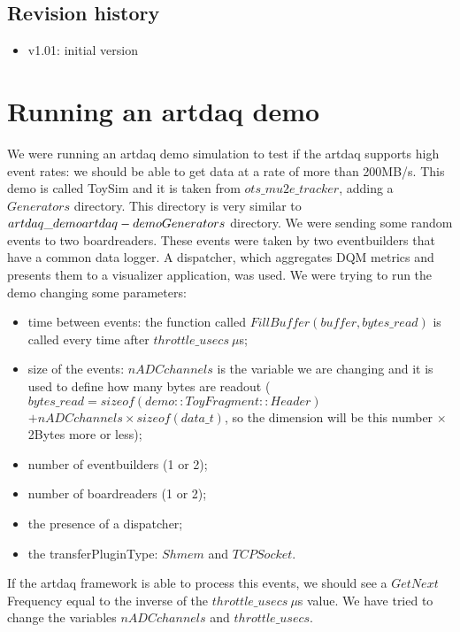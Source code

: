 \documentclass[12pt]{article}
\begin{document}
\subsection {Revision history} 
\begin{itemize}
\item
  v1.01: initial version
\end{itemize}
\newpage
\section{Running an artdaq demo}
We were running an artdaq demo simulation to test if the artdaq supports high event rates: we should be able to get data at a rate of more than 200MB/s. This demo is called ToySim and it is taken from $ots\_mu2e\_tracker$, adding a $Generators$ directory. This directory is very similar to $artdaq\_demo\/artdaq-demo\/Generators$ directory. We were sending some random events to two boardreaders. These events were taken by two eventbuilders that have a common data logger. A dispatcher, which aggregates DQM metrics and presents them to a visualizer application, was used. We were trying to run the demo changing some parameters:
\begin{itemize}
\item time between events: the function called $FillBuffer(buffer,bytes\_read)$ is called every time after $throttle\_ usecs \ \mu$s;
\item size of the events: $nADCchannels$ is the variable we are changing and it is used to define how many bytes are readout ($bytes\_read = sizeof(demo::ToyFragment::Header)$ $+ nADCchannels \times sizeof(data\_t)$, so the dimension will be this number $\times$ 2Bytes more or less);
\item number of eventbuilders (1 or 2);
\item number of boardreaders (1 or 2);
\item the presence of a dispatcher;
\item the  transferPluginType: $Shmem$ and  $TCPSocket$.
\end{itemize} 
If the artdaq framework is able to process this events, we should see a $GetNext$ Frequency equal to the inverse of the $throttle\_ usecs \ \mu$s value. We have tried to change the variables $nADCchannels$ and $throttle\_usecs$.
\end{document}
